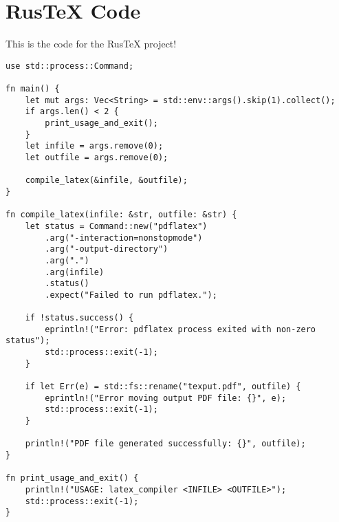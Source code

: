 \documentclass{article}
\begin{document}
\section{RusTeX Code}
This is the code for the RusTeX project!

\begin{verbatim}
use std::process::Command;

fn main() {
    let mut args: Vec<String> = std::env::args().skip(1).collect();
    if args.len() < 2 {
        print_usage_and_exit();
    }
    let infile = args.remove(0);
    let outfile = args.remove(0);

    compile_latex(&infile, &outfile);
}

fn compile_latex(infile: &str, outfile: &str) {
    let status = Command::new("pdflatex")
        .arg("-interaction=nonstopmode")
        .arg("-output-directory")
        .arg(".")
        .arg(infile)
        .status()
        .expect("Failed to run pdflatex.");

    if !status.success() {
        eprintln!("Error: pdflatex process exited with non-zero status");
        std::process::exit(-1);
    }

    if let Err(e) = std::fs::rename("texput.pdf", outfile) {
        eprintln!("Error moving output PDF file: {}", e);
        std::process::exit(-1);
    }

    println!("PDF file generated successfully: {}", outfile);
}

fn print_usage_and_exit() {
    println!("USAGE: latex_compiler <INFILE> <OUTFILE>");
    std::process::exit(-1);
}

\end{verbatim}
\end{document}
